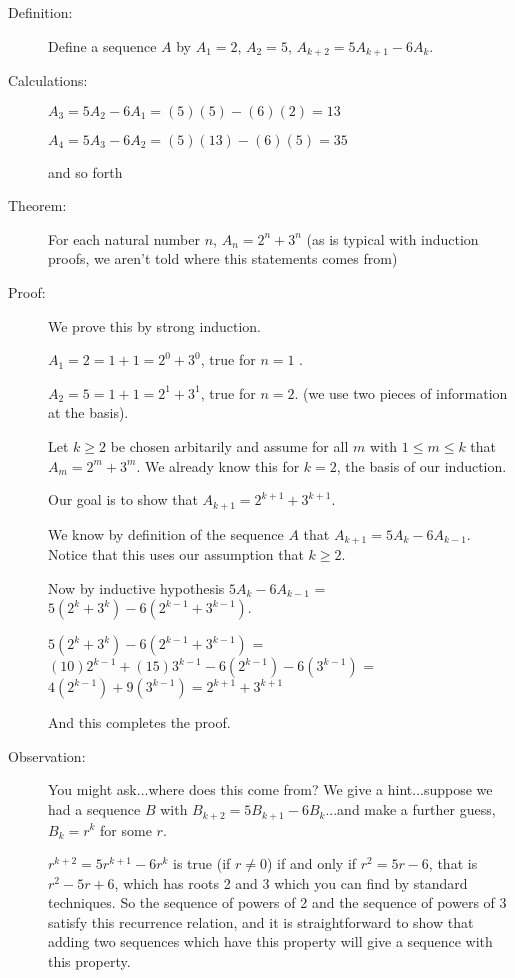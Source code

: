 \documentclass[12pt]{article}
\begin{document}
\begin{description}

\item[Definition:]  Define a sequence $A$ by $A_1=2$, $A_2=5$, $A_{k+2} = 5A_{k+1}-6A_k$.

\item[Calculations:]  $A_3 = 5A_2-6A_1 = (5)(5) - (6)(2) = 13$

$A_4 = 5A_3-6A_2 = (5)(13) - (6)(5) = 35$

and so forth

\item[Theorem:]  For each natural number $n$, $A_n = 2^n+3^n$ (as is typical with induction proofs, we aren't told where this statements comes from)

\item[Proof:]  We prove this by strong induction.  

$A_1=2=1+1=2^0+3^0$, true for $n=1$ .

$A_2=5=1+1=2^1+3^1$, true for $n=2$.   (we use two pieces of information at the basis).

Let $k\geq 2$ be chosen arbitarily and assume for all $m$ with $1 \leq m \leq k$ that $A_m = 2^m+3^m$.  We already know this for $k=2$, the basis of our induction.

Our goal is to show that $A_{k+1}=2^{k+1}+3^{k+1}$.

We know by definition of the sequence $A$ that $A_{k+1} = 5A_{k}-6A_{k-1}$.  Notice that this uses our assumption
that $k \geq 2$.

Now by inductive hypothesis $5A_{k}-6A_{k-1}$ = $5(2^k+3^k)-6(2^{k-1}+3^{k-1})$.

$5(2^k+3^k)-6(2^{k-1}+3^{k-1})$ = $(10)2^{k-1}+(15)3^{k-1}-6(2^{k-1})-6(3^{k-1})$ = $4(2^{k-1})+9(3^{k-1}) = 2^{k+1} + 3^{k+1}$

And this completes the proof.

\item[Observation:]  You might ask...where does this come from?  We give a hint...suppose we had a sequence $B$ with
$B_{k+2} = 5B_{k+1}-6B_k$...and make a further guess, $B_k = r^k$ for some $r$.

$r^{k+2} = 5r^{k+1}-6r^k$ is true (if $r \neq 0$) if and only if $r^2 = 5r-6$, that is $r^2-5r+6$, which has roots 2 and 3 which you can find by standard techniques.  So the sequence of powers of 2 and the sequence of powers of 3 satisfy this recurrence relation, and it is straightforward to show that adding two sequences which have this property will give a sequence with this property.


\end{description}
\end{document}
